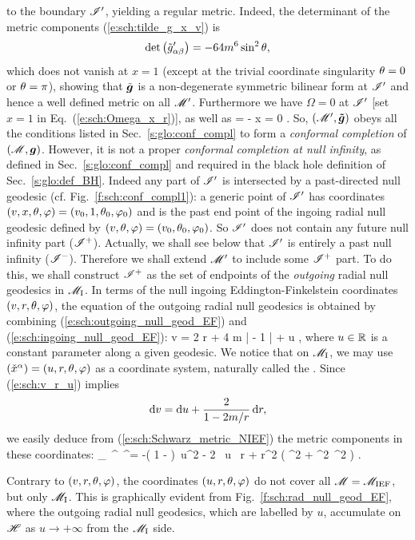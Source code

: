 to the boundary $\mathscr{I}'$, yielding a regular metric. Indeed, the determinant of
the metric components (\ref{e:sch:tilde_g_x_v}) is
\[
    \det\left({\tilde{g}'}_{\alpha\beta}\right) = - 64 m^6 \sin^2\theta ,
\]
which does not vanish at $x=1$ (except at the trivial coordinate singularity
$\theta=0$ or $\theta=\pi$), showing that $\tilde{\bm{g}}$ is a non-degenerate
symmetric bilinear form at $\mathscr{I}'$ and hence a well defined metric on all
$\mathscr{M}'$.
Furthermore
we have $\Omega=0$ at $\mathscr{I}'$ [set $x=1$ in Eq.~(\ref{e:sch:Omega_x_r})], as well as
\be
    \dd \Omega = - \dd x \not = 0 .
\ee
So, $(\mathscr{M}',\bm{\tilde{g}})$ obeys all the conditions
listed in Sec.~\ref{s:glo:conf_compl} to form a \emph{conformal completion}
of $(\mathscr{M},\bm{g})$.
However, it is not a proper \emph{conformal completion at null infinity},
as defined in Sec.~\ref{s:glo:conf_compl} and required in the black hole
definition of Sec.~\ref{s:glo:def_BH}. Indeed any part of $\mathscr{I}'$ is intersected by
a past-directed null geodesic (cf. Fig.~\ref{f:sch:conf_compl1}): a generic point of $\mathscr{I}'$ has coordinates
$(v,x,\theta,\varphi) = (v_0,1,\theta_0,\varphi_0)$ and is the past end point of the
ingoing radial null geodesic defined by
$(v,\theta,\varphi) = (v_0,\theta_0,\varphi_0)$.
So $\mathscr{I}'$ does not contain any future null infinity part ($\mathscr{I}^+$). Actually,
we shall see below that $\mathscr{I}'$ is entirely a past null infinity ($\mathscr{I}^-$).
Therefore we shall extend $\mathscr{M}'$ to include some $\mathscr{I}^+$ part.
To do this, we shall construct $\mathscr{I}^+$ as the set of endpoints of the
\emph{outgoing} radial null geodesics in $\mathscr{M}_{\rm I}$. In terms of
the null ingoing Eddington-Finkelstein coordinates $(v,r,\theta,\varphi)$,
the equation of the
outgoing radial null geodesics is obtained by combining (\ref{e:sch:outgoing_null_geod_EF}) and (\ref{e:sch:ingoing_null_geod_EF}):
\be \label{e:sch:v_r_u}
    v = 2 r + 4 m \ln \left|  - 1 \right| + u ,
\ee
where $u\in\mathbb{R}$ is a constant parameter along a given geodesic.
We notice that on $\mathscr{M}_{\rm I}$, we may use $(\check{x}^\alpha) = (u,r,\theta,\varphi)$ as a coordinate
system, naturally called the . Since (\ref{e:sch:v_r_u}) implies
\[
    \mathrm{d} v = \mathrm{d} u + \frac{2}{1-2m/r}\, \mathrm{d} r,
\]
we easily deduce from (\ref{e:sch:Schwarz_metric_NIEF}) the metric components
in these coordinates:
\be \label{e:sch:g_u_r}
        {}_{\mu\nu}\, ^\mu \, ^\nu =
            -\left( 1 -  \right)\, \D u^2
            - 2 \, \D u \, \D r
        + r^2 \left( \D\th^2 + \sin^2\th\, \D\ph^2 \right) .
\ee
\begin{remark}
Contrary to $(v,r,\theta,\varphi)$, the coordinates $(u,r,\theta,\varphi)$ do not cover
all $\mathscr{M} = \mathscr{M}_{\rm IEF}$, but only $\mathscr{M}_{\rm I}$. This is graphically
evident from
Fig.~\ref{f:sch:rad_null_geod_EF}, where the outgoing radial null geodesics,
which are labelled by $u$, accumulate on $\mathscr{H}$ as $u\rightarrow +\infty$
from the $\mathscr{M}_{\rm I}$ side.
\end{remark}

